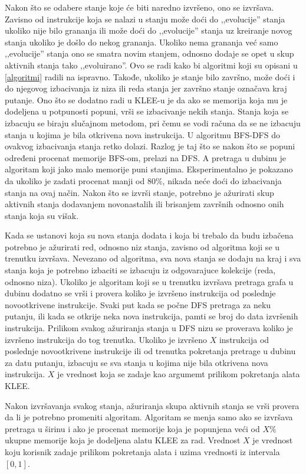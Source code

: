 \documentclass[12pt,oneside]{memoir}
\begin{document}
Nakon što se odabere stanje koje će biti naredno izvršeno, ono se izvršava. Zavisno od instrukcije koja se nalazi u stanju može doći do ,,evolucije'' stanja ukoliko nije bilo grananja ili može doći do ,,evolucije'' stanja uz kreiranje novog stanja ukoliko je došlo do nekog grananja. Ukoliko nema grananja već samo ,,evolucije'' stanja ono se smatra novim stanjem, odnosno dodaje se opet u skup aktivnih stanja tako ,,evoluirano''. Ovo se radi kako bi algoritmi koji su opisani u \ref{algoritmi} radili na ispravno. Takođe, ukoliko je stanje bilo završno, može doći i do njegovog izbacivanja iz niza ili reda stanja jer završno stanje označava kraj putanje. Ono što se dodatno radi u KLEE-u je da ako se memorija koja mu je dodeljena u potpunosti popuni, vrši se izbacivanje nekih stanja. Stanja koja se izbacuju se biraju slučajnom metodom, pri čemu se vodi računa da se ne izbacuju stanja u kojima je bila otkrivena nova instrukcija. U algoritmu BFS-DFS do ovakvog izbacivanja stanja retko dolazi. Razlog je taj što se nakon  što se popuni određeni procenat memorije BFS-om, prelazi na DFS. A pretraga u dubinu je algoritam koji jako malo memorije puni stanjima. Eksperimentalno je pokazano da ukoliko je zadati procenat manji od 80\%, nikada neće doći do izbacivanja stanja na ovaj način. Nakon što se izvrši stanje, potrebno je ažurirati skup aktivnih stanja dodavanjem novonastalih ili brisanjem završnih odnosno onih stanja koja su višak.

Kada se ustanovi koja su nova stanja dodata i koja bi trebalo da budu izbačena potrebno je ažurirati red, odnosno niz stanja, zavisno od algoritma koji se u trenutku izvršava. Nevezano od algoritma, sva nova stanja se dodaju na kraj i sva stanja koja je potrebno izbaciti se izbacuju iz odgovarajuce kolekcije (reda, odnosno niza). Ukoliko je algoritam koji se u trenutku izvršava pretraga grafa u dubinu dodatno se vrši i provera koliko je izvršeno instrukcija od poslednje novootkrivene instrukcije. Svaki put kada se počne DFS pretraga za neku putanju, ili kada se otkrije neka nova instrukcija, pamti se broj do data izvršenih instrukcija. Prilikom svakog ažuriranja stanja u DFS nizu se proverava koliko je izvršeno instrukcija do tog trenutka. Ukoliko je izvršeno $X$ instrukcija od poslednje novootkrivene instrukcije ili od trenutka pokretanja pretrage u dubinu za datu putanju, izbacuju se sva stanja u kojima nije bila otkrivena nova instrukcija. $X$ je vrednost koja se zadaje kao argumemt prilikom pokretanja alata KLEE.

Nakon izvršavanja svakog stanja, ažuriranja skupa aktivnih stanja se vrši provera da li je potrebno promeniti algoritam. Algoritam se menja samo ako se izvršava pretraga u širinu i ako je procenat memorije koja je popunjena veći od $X\%$ ukupne memorije koja je dodeljena alatu KLEE za rad. Vrednost $X$ je vrednost koju korisnik zadaje prilikom pokretanja alata i uzima vrednosti iz intervala $[0, 1]$.
\end{document}
